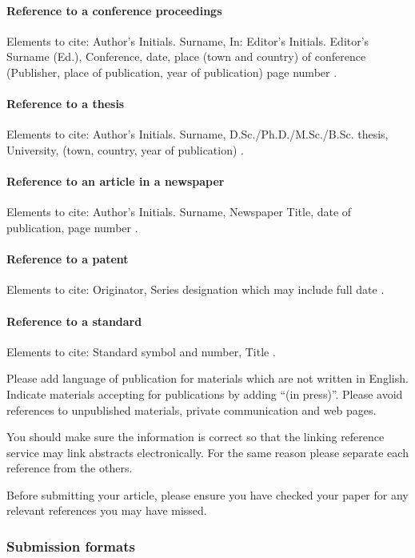 \documentclass[USenglish,oneside,twocolumn]{article}
\begin{document}
\paragraph{Reference to a conference proceedings}
Elements to cite:
Author's Initials. Surname,
In: Editor's Initials. Editor's Surname (Ed.),
Conference,
date, place (town and country) of conference
(Publisher, place of publication, year of publication)
page number \cite{proceedings}.


\paragraph{Reference to a thesis}
Elements to cite:
Author's Initials. Surname,
D.Sc./Ph.D./M.Sc./B.Sc. thesis,
University,
(town, country, year of publication) \cite{thesis}.


\paragraph{Reference to an article in a newspaper}
Elements to cite:
Author's Initials. Surname,
Newspaper Title,
date of publication,
page number \cite{newspaper-1,newspaper-2}.


\paragraph{Reference to a patent}
Elements to cite:
Originator,
Series designation which may include full date \cite{patent}.


\paragraph{Reference to a standard}
Elements to cite:
Standard symbol and number,
Title \cite{standard-1,standard-2}.

Please add language of publication for materials which are not written in English. Indicate materials accepting for publications by adding ``(in press)''. Please avoid references to unpublished materials, private communication and web pages.

You should make sure the information is correct so that the linking reference service may link abstracts electronically. For the same reason please separate each reference from the others.

Before submitting your article, please ensure you have checked your paper for any relevant references you may have missed.

\subsubsection{Submission formats}
\end{document}

